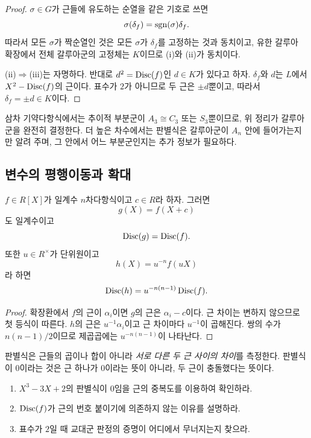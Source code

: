 \begin{proof}
$\sigma\in G$가 근들에 유도하는 순열을 같은 기호로 쓰면
\[
  \sigma(\delta_f)=\operatorname{sgn}(\sigma)\delta_f.
\]
따라서 모든 $\sigma$가 짝순열인 것은 모든 $\sigma$가 $\delta_f$를 고정하는 것과 동치이고, 유한 갈루아 확장에서 전체 갈루아군의 고정체는 $K$이므로 (i)와 (ii)가 동치이다.

(ii)$\Rightarrow$(iii)는 자명하다. 반대로 $d^2=\operatorname{Disc}(f)$인 $d\in K$가 있다고 하자. $\delta_f$와 $d$는 $L$에서 $X^2-\operatorname{Disc}(f)$의 근이다. 표수가 $2$가 아니므로 두 근은 $\pm d$뿐이고, 따라서 $\delta_f=\pm d\in K$이다.
\end{proof}

\begin{remark}
삼차 기약다항식에서는 추이적 부분군이 $A_3\cong C_3$ 또는 $S_3$뿐이므로, 위 정리가 갈루아군을 완전히 결정한다. 더 높은 차수에서는 판별식은 갈루아군이 $A_n$ 안에 들어가는지만 알려 주며, 그 안에서 어느 부분군인지는 추가 정보가 필요하다.
\end{remark}

\subsection{변수의 평행이동과 확대}

\begin{proposition}
$f\in R[X]$가 일계수 $n$차다항식이고 $c\in R$라 하자. 그러면
\[
  g(X)=f(X+c)
\]
도 일계수이고
\[
  \operatorname{Disc}(g)=\operatorname{Disc}(f).
\]
또한 $u\in R^\times$가 단위원이고
\[
  h(X)=u^{-n}f(uX)
\]
라 하면
\[
  \operatorname{Disc}(h)=u^{-n(n-1)}\operatorname{Disc}(f).
\]
\end{proposition}

\begin{proof}
확장환에서 $f$의 근이 $\alpha_i$이면 $g$의 근은 $\alpha_i-c$이다. 근 차이는 변하지 않으므로 첫 등식이 따른다. $h$의 근은 $u^{-1}\alpha_i$이고 근 차이마다 $u^{-1}$이 곱해진다. 쌍의 수가 $n(n-1)/2$이므로 제곱곱에는 $u^{-n(n-1)}$이 나타난다.
\end{proof}

\begin{pitfall}
판별식은 근들의 곱이나 합이 아니라 \emph{서로 다른 두 근 사이의 차이}를 측정한다. 판별식이 $0$이라는 것은 근 하나가 $0$이라는 뜻이 아니라, 두 근이 충돌했다는 뜻이다.
\end{pitfall}

\begin{checkpoint}
\begin{enumerate}[label=(\alph*)]
  \item $X^3-3X+2$의 판별식이 $0$임을 근의 중복도를 이용하여 확인하라.
  \item $\operatorname{Disc}(f)$가 근의 번호 붙이기에 의존하지 않는 이유를 설명하라.
  \item 표수가 $2$일 때 교대군 판정의 증명이 어디에서 무너지는지 찾으라.
\end{enumerate}
\end{checkpoint}
